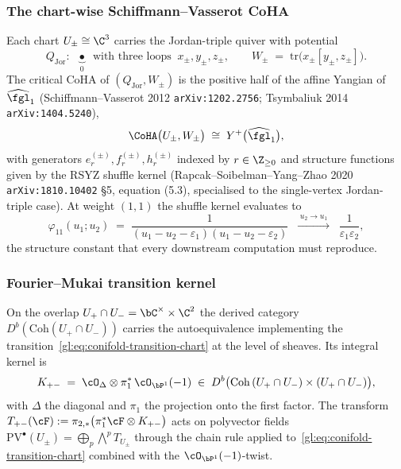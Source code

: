\subsubsection{The chart-wise Schiffmann--Vasserot CoHA}

Each chart $U_\pm \cong \C^3$ carries the Jordan-triple quiver with
potential
\[
 Q_{\mathrm{Jor}} : \;\; \underbrace{\bullet}_{0}
 \;\;\text{with three loops}\;\; x_\pm, y_\pm, z_\pm,
 \qquad
 W_\pm \;=\; \mathrm{tr}\bigl(x_\pm[y_\pm, z_\pm]\bigr).
\]
The critical CoHA of $(Q_{\mathrm{Jor}}, W_\pm)$ is the positive half of the
affine Yangian of $\widehat{\fgl}_1$ (Schiffmann--Vasserot 2012
\texttt{arXiv:1202.2756}; Tsymbaliuk 2014 \texttt{arXiv:1404.5240}),
\[
 \CoHA\bigl(U_\pm, W_\pm\bigr) \;\cong\; Y^+\bigl(\widehat{\fgl}_1\bigr),
\]
with generators $e_r^{(\pm)}, f_r^{(\pm)}, h_r^{(\pm)}$ indexed by $r \in
\Z_{\geq 0}$ and structure functions given by the RSYZ shuffle kernel
(Rapcak--Soibelman--Yang--Zhao 2020 \texttt{arXiv:1810.10402} \S5,
equation (5.3), specialised to the single-vertex Jordan-triple case).
At weight $(1,1)$ the shuffle kernel evaluates to
\begin{equation}\label{eq:structure-constant-1-1}
 \varphi_{11}(u_1; u_2) \;=\; \frac{1}{(u_1 - u_2 - \varepsilon_1)(u_1 - u_2 - \varepsilon_2)}
 \;\;\xrightarrow{\;u_2 \to u_1\;}\;\;
 \frac{1}{\varepsilon_1 \varepsilon_2},
\end{equation}
the structure constant that every downstream computation must reproduce.

\subsubsection{Fourier--Mukai transition kernel}

On the overlap $U_+ \cap U_- = \bC^\times \times \C^2$ the derived category
$D^b(\mathrm{Coh}(U_+ \cap U_-))$ carries the autoequivalence implementing
the transition~\eqref{gl:eq:conifold-transition-chart} at the level of sheaves.
Its integral kernel is
\begin{equation}\label{eq:FM-kernel-conifold}
 K_{+-} \;=\; \cO_\Delta \otimes \pi_1^*\,\cO_{\bP^1}(-1)
 \;\in\; D^b\bigl(\mathrm{Coh}\,(U_+ \cap U_-) \times (U_+ \cap U_-)\bigr),
\end{equation}
with $\Delta$ the diagonal and $\pi_1$ the projection onto the first factor.
The transform $T_{+-}(\cF) := \pi_{2,*}\bigl(\pi_1^*\cF \otimes K_{+-}\bigr)$
acts on polyvector fields
$\mathrm{PV}^\bullet(U_\pm) = \bigoplus_p \bigwedge^p T_{U_\pm}$ through the
chain rule applied to~\eqref{gl:eq:conifold-transition-chart} combined with the
$\cO_{\bP^1}(-1)$-twist.


